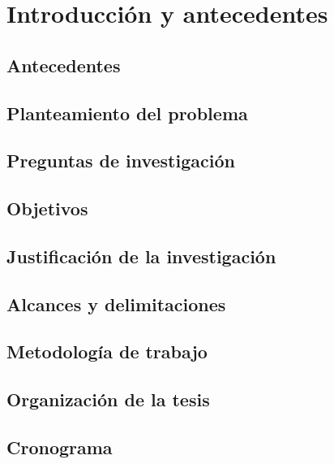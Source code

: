 \chapter{Introducción y antecedentes}


\section{Antecedentes}


\section{Planteamiento del problema}


\section{Preguntas de investigación}


\section{Objetivos}


\section{Justificación de la investigación}


\section{Alcances y delimitaciones}


\section{Metodología de trabajo}


\section{Organización de la tesis}


\section{Cronograma}
